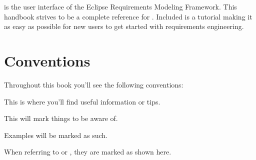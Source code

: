 % 

\pror{} is the user interface of the Eclipse Requirements Modeling Framework.  This handbook strives to be a complete reference for \pror{}.  Included is a tutorial making it as easy as possible for new users to get started with requirements engineering.

\section{Conventions}

Throughout this book you'll see the following conventions:

\begin{info}
This is where you'll find useful information or tips.
\end{info}

\begin{warning}
This will mark things to be aware of.
\end{warning}

\begin{example}
Examples will be marked as such.
\end{example}

When referring to  or , they are marked as shown here.

